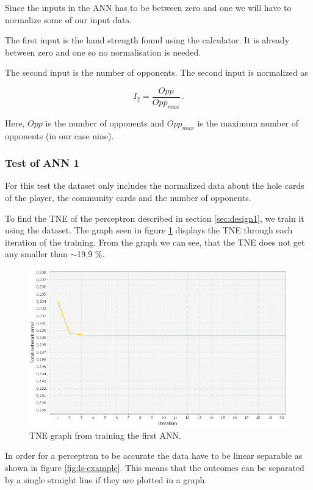 Since the inputs in the ANN has to be between zero and one we will have to normalize some of our input data.

The first input is the hand strength found using the calculator. It is already between zero and one so no normalisation is needed. 

The second input is the number of opponents. The second input is normalized as 

\[I_{2} = \frac{Opp}{Opp_{max}}\,.\]

Here, $Opp$ is the number of opponents and $Opp_{max}$ is the maximum number of opponents (in our case nine).



\subsubsection{Test of ANN 1}
\label{sec:ann-test1}
For this test the dataset only includes the normalized data about the hole cards of the player, the community cards and the number of opponents.

To find the TNE of the perceptron described in section \ref{sec:design1}, we train it using the dataset. The graph seen in figure \ref{fig:tneg1} displays the TNE through each iteration of the training. From the graph we can see, that the TNE does not get any smaller than $\sim$19,9 \%.

\begin{figure}[H]
  \center
    \includegraphics[scale=0.6]{images/nn/default-nn1-err.png}
  \caption{TNE graph from training the first ANN.\label{fig:tneg1}}
\end{figure}


In order for a perceptron to be accurate the data have to be linear separable as shown in figure \ref{fig:ls-example}. This means that the outcomes can be separated by a single straight line if they are plotted in a graph. 

